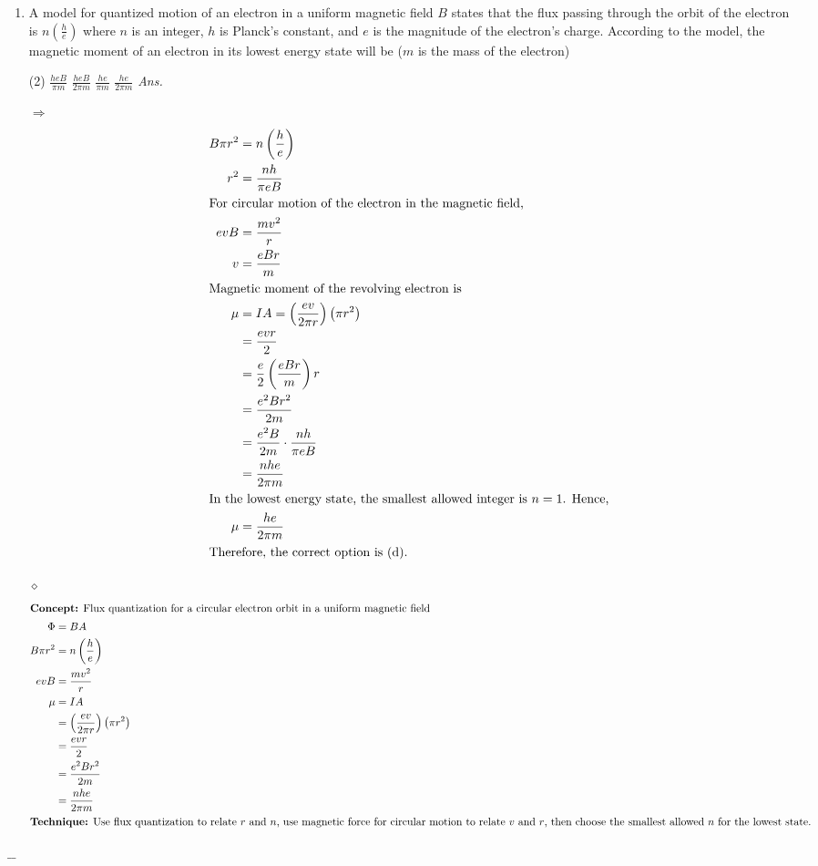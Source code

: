 \documentclass[preview, border={10mm, 5mm, 10mm, 10mm}]{standalone}
\title{\textsc{}}
\newcommand{\ans}{\textcolor{blue!20!red}{\textit{\quad Ans.}}}
\newenvironment{solution}{\par\noindent\color{red!80!black}$\Rightarrow$\enspace\ignorespaces}{\par}
\newenvironment{idea}{\par\noindent\color{violet!80!black}$\diamond$\enspace\ignorespaces}{\par}
\begin{document}
\begin{enumerate}[leftmargin=*]
\item A model for quantized motion of an electron in a uniform magnetic field $B$ states that the flux passing through the orbit of the electron is $n\left(\frac{h}{e}\right)$ where $n$ is an integer, $h$ is Planck's constant, and $e$ is the magnitude of the electron's charge. According to the model, the magnetic moment of an electron in its lowest energy state will be ($m$ is the mass of the electron)
\begin{tasks}(2)
    \task $\frac{heB}{\pi m}$
    \task $\frac{heB}{2\pi m}$
    \task $\frac{he}{\pi m}$
    \task $\frac{he}{2\pi m}$ \ans
\end{tasks}
\begin{solution}
\begin{align*}
B\pi r^2 &= n\left(\frac{h}{e}\right) \\
r^2 &= \frac{nh}{\pi eB} \\
\intertext{For circular motion of the electron in the magnetic field,}
e v B &= \frac{mv^2}{r} \\
v &= \frac{eBr}{m} \\
\intertext{Magnetic moment of the revolving electron is}
\mu &= IA = \left(\frac{ev}{2\pi r}\right)\left(\pi r^2\right) \\
      &= \frac{evr}{2} \\
      &= \frac{e}{2}\left(\frac{eBr}{m}\right)r \\
      &= \frac{e^2Br^2}{2m} \\
      &= \frac{e^2B}{2m}\cdot \frac{nh}{\pi eB} \\
      &= \frac{nhe}{2\pi m} \\
\intertext{In the lowest energy state, the smallest allowed integer is $n = 1$. Hence,}
\mu &= \frac{he}{2\pi m} \\
\intertext{Therefore, the correct option is (d).}
\end{align*}
\end{solution}

\begin{idea}
    \begin{align*}
    \intertext{\textbf{Concept:} Flux quantization for a circular electron orbit in a uniform magnetic field}
    \Phi &= BA \\
    B\pi r^2 &= n\left(\frac{h}{e}\right) \\
    evB &= \frac{mv^2}{r} \\
    \mu &= IA \\
    &= \left(\frac{ev}{2\pi r}\right)\left(\pi r^2\right) \\
    &= \frac{evr}{2} \\
    &= \frac{e^2Br^2}{2m} \\
    &= \frac{nhe}{2\pi m} \\
    \intertext{\textbf{Technique:} Use flux quantization to relate $r$ and $n$, use magnetic force for circular motion to relate $v$ and $r$, then choose the smallest allowed $n$ for the lowest state.}
    \end{align*}
\end{idea}
\end{enumerate}
\hfill $\_\_$
\end{document}
